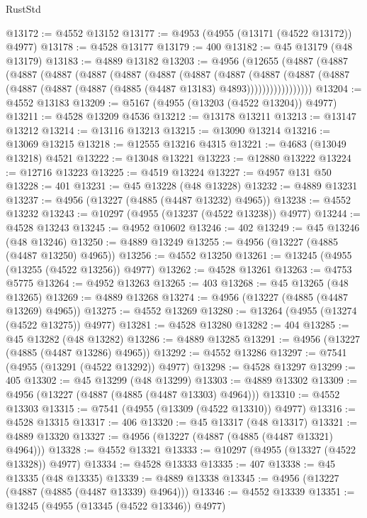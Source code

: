 \begin{lexlean}{RustStd}
\begin{coremodule}
@13172 := @4552 @13152
@13177 := @4953 (@4955 (@13171 (@4522 @13172)) @4977)
@13178 := @4528 @13177
@13179 := 400
@13182 := @45 @13179 (@48 @13179)
@13183 := @4889 @13182
@13203 := @4956
    (@12655
      (@4887
        (@4887
          (@4887
            (@4887
              (@4887
                (@4887
                  (@4887
                    (@4887
                      (@4887
                        (@4887
                          (@4887
                            (@4887 (@4887 (@4887 (@4887 (@4885 (@4487 @13183) @4893)))))))))))))))))
@13204 := @4552 @13183
@13209 := @5167 (@4955 (@13203 (@4522 @13204)) @4977)
@13211 := @4528 @13209 @4536
@13212 := @13178 @13211
@13213 := @13147 @13212
@13214 := @13116 @13213
@13215 := @13090 @13214
@13216 := @13069 @13215
@13218 := @12555 @13216 @4315
@13221 := @4683 (@13049 @13218) @4521
@13222 := @13048 @13221
@13223 := @12880 @13222
@13224 := @12716 @13223
@13225 := @4519 @13224
@13227 := @4957 @131 @50
@13228 := 401
@13231 := @45 @13228 (@48 @13228)
@13232 := @4889 @13231
@13237 := @4956 (@13227 (@4885 (@4487 @13232) @4965))
@13238 := @4552 @13232
@13243 := @10297 (@4955 (@13237 (@4522 @13238)) @4977)
@13244 := @4528 @13243
@13245 := @4952 @10602
@13246 := 402
@13249 := @45 @13246 (@48 @13246)
@13250 := @4889 @13249
@13255 := @4956 (@13227 (@4885 (@4487 @13250) @4965))
@13256 := @4552 @13250
@13261 := @13245 (@4955 (@13255 (@4522 @13256)) @4977)
@13262 := @4528 @13261
@13263 := @4753 @5775
@13264 := @4952 @13263
@13265 := 403
@13268 := @45 @13265 (@48 @13265)
@13269 := @4889 @13268
@13274 := @4956 (@13227 (@4885 (@4487 @13269) @4965))
@13275 := @4552 @13269
@13280 := @13264 (@4955 (@13274 (@4522 @13275)) @4977)
@13281 := @4528 @13280
@13282 := 404
@13285 := @45 @13282 (@48 @13282)
@13286 := @4889 @13285
@13291 := @4956 (@13227 (@4885 (@4487 @13286) @4965))
@13292 := @4552 @13286
@13297 := @7541 (@4955 (@13291 (@4522 @13292)) @4977)
@13298 := @4528 @13297
@13299 := 405
@13302 := @45 @13299 (@48 @13299)
@13303 := @4889 @13302
@13309 := @4956 (@13227 (@4887 (@4885 (@4487 @13303) @4964)))
@13310 := @4552 @13303
@13315 := @7541 (@4955 (@13309 (@4522 @13310)) @4977)
@13316 := @4528 @13315
@13317 := 406
@13320 := @45 @13317 (@48 @13317)
@13321 := @4889 @13320
@13327 := @4956 (@13227 (@4887 (@4885 (@4487 @13321) @4964)))
@13328 := @4552 @13321
@13333 := @10297 (@4955 (@13327 (@4522 @13328)) @4977)
@13334 := @4528 @13333
@13335 := 407
@13338 := @45 @13335 (@48 @13335)
@13339 := @4889 @13338
@13345 := @4956 (@13227 (@4887 (@4885 (@4487 @13339) @4964)))
@13346 := @4552 @13339
@13351 := @13245 (@4955 (@13345 (@4522 @13346)) @4977)

\end{coremodule}
\end{lexlean}
